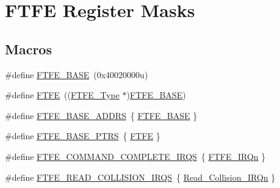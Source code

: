 \hypertarget{group___f_t_f_e___register___masks}{}\section{F\+T\+FE Register Masks}
\label{group___f_t_f_e___register___masks}
\subsection*{Macros}
\begin{DoxyCompactItemize}
\item 
\#define \mbox{\hyperlink{group___f_t_f_e___register___masks_ga78ffb1457d354ca3ed49ee1b93b78193}{F\+T\+F\+E\+\_\+\+B\+A\+SE}}~(0x40020000u)
\item 
\#define \mbox{\hyperlink{group___f_t_f_e___register___masks_ga08e0af7718eb3edb5211071bc350605c}{F\+T\+FE}}~((\mbox{\hyperlink{struct_f_t_f_e___type}{F\+T\+F\+E\+\_\+\+Type}} $\ast$)\mbox{\hyperlink{group___f_t_f_e___register___masks_ga78ffb1457d354ca3ed49ee1b93b78193}{F\+T\+F\+E\+\_\+\+B\+A\+SE}})
\item 
\#define \mbox{\hyperlink{group___f_t_f_e___register___masks_gae4cbd5858122e7e88e3e6227507954ad}{F\+T\+F\+E\+\_\+\+B\+A\+S\+E\+\_\+\+A\+D\+D\+RS}}~\{ \mbox{\hyperlink{group___f_t_f_e___register___masks_ga78ffb1457d354ca3ed49ee1b93b78193}{F\+T\+F\+E\+\_\+\+B\+A\+SE}} \}
\item 
\#define \mbox{\hyperlink{group___f_t_f_e___register___masks_ga5ae2dee20c785365da3d603faf7a1dd2}{F\+T\+F\+E\+\_\+\+B\+A\+S\+E\+\_\+\+P\+T\+RS}}~\{ \mbox{\hyperlink{group___f_t_f_e___register___masks_ga08e0af7718eb3edb5211071bc350605c}{F\+T\+FE}} \}
\item 
\#define \mbox{\hyperlink{group___f_t_f_e___register___masks_gaaac748d7395492209690894787db8ce0}{F\+T\+F\+E\+\_\+\+C\+O\+M\+M\+A\+N\+D\+\_\+\+C\+O\+M\+P\+L\+E\+T\+E\+\_\+\+I\+R\+QS}}~\{ \mbox{\hyperlink{group___interrupt__vector__numbers_gga666eb0caeb12ec0e281415592ae89083abaa48ed6ed98d36e090f1d18dff97da2}{F\+T\+F\+E\+\_\+\+I\+R\+Qn}} \}
\item 
\#define \mbox{\hyperlink{group___f_t_f_e___register___masks_gaf8570868b30e7a06fe146f27610363d9}{F\+T\+F\+E\+\_\+\+R\+E\+A\+D\+\_\+\+C\+O\+L\+L\+I\+S\+I\+O\+N\+\_\+\+I\+R\+QS}}~\{ \mbox{\hyperlink{group___interrupt__vector__numbers_gga666eb0caeb12ec0e281415592ae89083aa3caf4837979a4a300de12aa1ec8fc74}{Read\+\_\+\+Collision\+\_\+\+I\+R\+Qn}} \}
\end{DoxyCompactItemize}
